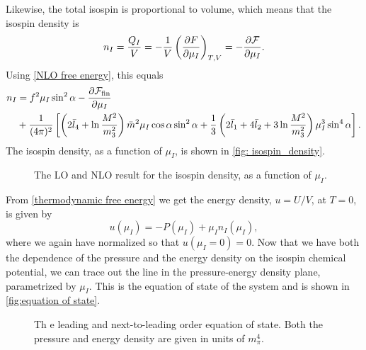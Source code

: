 Likewise, the total isospin is proportional to volume, which means that the isospin density is
%
\begin{equation}
    n_I = \frac{Q_I}{V} = - \frac{1}{V} \left(\pdv{F}{\mu_I}\right)_{T, V}
    = - \pdv{\mathcal{F}}{\mu_I}.
\end{equation}
%
Using \autoref{NLO free energy}, this equals
%
\begin{align}
    \nonumber
    n_I & = 
    f^2 \mu_I \sin^2 \alpha
    - \pdv{\mathcal{F}_\mathrm{fin}}{\mu_I} \\
    & + \frac{1}{(4 \pi)^2}
    \left[
            \left(
                2\bar l_4+\ln\frac{M^2}{m_3^2}
            \right) 
            \bar m^2 \mu_I \cos\alpha \sin^2 \alpha
            +\frac{1}{3}
            \left(
                2\bar l_1 + 4 \bar l_2 + 3\ln\frac{M^2}{m_3^2}
            \right)
            \mu_I^3 \sin^4 \alpha
    \right].
\end{align}
%
The isospin density, as a function of $\mu_I$, is shown in \autoref{fig: isospin_density}.
\begin{figure}[h]
    \centering
    \vspace{-0.2cm}
    \caption{The LO and NLO result for the isospin density, as a function of $\mu_I$.}
    \label{fig: isospin_density}
\end{figure}

From \autoref{thermodynamic free energy} we get the energy density, $u = U/V$, at $T = 0$, is given by
%
\begin{equation}
    u(\mu_I) = -P(\mu_I) + \mu_I n_I(\mu_I),
\end{equation}
%
where we again have normalized so that $u(\mu_I = 0) = 0$.
Now that we have both the dependence of the pressure and the energy density on the isospin chemical potential, we can trace out the line in the pressure-energy density plane, parametrized by $\mu_I$.
This is the equation of state of the system and is shown in \autoref{fig:equation of state}.

\begin{figure}[h]
    \centering
    \caption{Th e leading and next-to-leading order equation of state. Both the pressure and energy density are given in units of $m_\pi^4$.}
    \label{fig:equation of state}
\end{figure}

